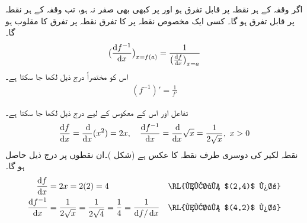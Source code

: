 اگر وقفہ  کے ہر نقطہ پر  قابل تفرق ہو اور  پر  کبھی بھی صفر  نہ ہو، تب وقفہ  کے ہر نقطہ پر  قابل تفرق ہو گا۔ کسی ایک مخصوص نقطہ  پر  کا تفرق نقطہ  پر تفرق  کا مقلوب ہو گا۔
\begin{align}\label{مساوات_ماورائی_قاعدہ_الٹ_تفرق_الف}
\big(\frac{\dif f^{-1}}{\dif x}\big)_{x=f(a)}=\frac{1}{\big(\frac{\dif f}{\dif x}\big)_{x=a}}
\end{align}
اس کو مختصراً درج ذیل لکھا جا سکتا ہے۔
\begin{align}\label{مساوات_ماورائی_قاعدہ_الٹ_تفرق_ب}
(f^{-1})'=\frac{1}{f'}
\end{align}

تفاعل  اور اس کے معکوس  کے لیے درج ذیل لکھا جا سکتا ہے۔
\begin{align*}
\frac{\dif f}{\dif x}=\frac{\dif}{\dif x}(x^2)=2x,\quad \frac{\dif f^{-1}}{\dif x}=\frac{\dif}{\dif x}\sqrt{x}=\frac{1}{2\sqrt{x}},\,\,x>0
\end{align*}
نقطہ  لکیر  کی دوسری طرف نقطہ  کا عکس ہے (شکل )۔ان نقطوں پر درج ذیل حاصل ہو گا۔
\begin{align*}
\frac{\dif f}{\dif x}&=2x=2(2)=4&&\text{\RL{نقطہ $(2,4)$ پر}}\\
\frac{\dif f^{-1}}{\dif x}&=\frac{1}{2\sqrt{x}}=\frac{1}{2\sqrt{4}}=\frac{1}{4}=\frac{1}{\dif f/\dif x}&&\text{\RL{نقطہ $(4,2)$ پر}}
\end{align*}
